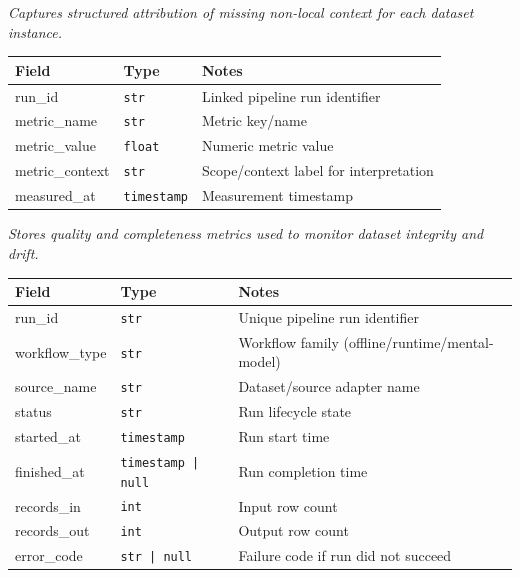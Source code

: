 \documentclass[a4paper,12pt]{article}
\begin{document}
\noindent \textit{Captures structured attribution of missing non-local context for each dataset instance.}\\

\begin{tcolorbox}[title=QualityMetricSchema]
\footnotesize
\begin{tabularx}{\linewidth}{@{} l l Y @{}}
\toprule
\textbf{Field} & \textbf{Type} & \textbf{Notes} \\
\midrule
run\_id & \texttt{str} & Linked pipeline run identifier \\
metric\_name & \texttt{str} & Metric key/name \\
metric\_value & \texttt{float} & Numeric metric value \\
metric\_context & \texttt{str} & Scope/context label for interpretation \\
measured\_at & \texttt{timestamp} & Measurement timestamp \\
\bottomrule
\end{tabularx}
\end{tcolorbox}

\noindent\textit{Stores quality and completeness metrics used to monitor dataset integrity and drift.}\\

\begin{tcolorbox}[title=PipelineRunSchema]
\footnotesize
\begin{tabularx}{\linewidth}{@{} l l Y @{}}
\toprule
\textbf{Field} & \textbf{Type} & \textbf{Notes} \\
\midrule
run\_id & \texttt{str} & Unique pipeline run identifier \\
workflow\_type & \texttt{str} & Workflow family (offline/runtime/mental-model) \\
source\_name & \texttt{str} & Dataset/source adapter name \\
status & \texttt{str} & Run lifecycle state \\
started\_at & \texttt{timestamp} & Run start time \\
finished\_at & \texttt{timestamp | null} & Run completion time \\
records\_in & \texttt{int} & Input row count \\
records\_out & \texttt{int} & Output row count \\
error\_code & \texttt{str | null} & Failure code if run did not succeed \\
\bottomrule
\end{tabularx}
\end{tcolorbox}
\end{document}
